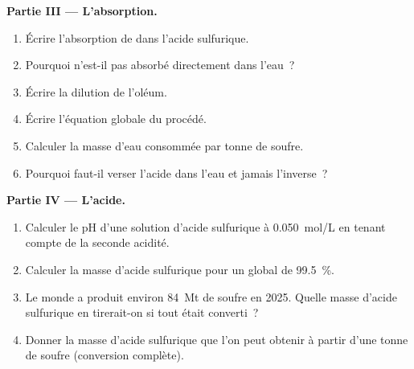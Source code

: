 \begin{problem}
\medskip
\noindent\textbf{Partie III --- L'absorption.}
\begin{enumerate}[resume]
  \item Écrire l'absorption de  dans l'acide sulfurique.
  \item Pourquoi  n'est-il pas absorbé directement dans l'eau~?
  \item Écrire la dilution de l'oléum.
  \item Écrire l'équation globale du procédé.
  \item Calculer la masse d'eau consommée par tonne de soufre.
  \item Pourquoi faut-il verser l'acide dans l'eau et jamais
        l'inverse~?
\end{enumerate}

\medskip
\noindent\textbf{Partie IV --- L'acide.}
\begin{enumerate}[resume]
  \item Calculer le pH d'une solution d'acide sulfurique à
        \qty{0.050}{mol/L} en tenant compte de la seconde acidité.
  \item Calculer la masse d'acide sulfurique pour un  global de
        \qty{99.5}{\percent}.
  \item Le monde a produit environ \qty{84}{Mt} de soufre en 2025. Quelle
        masse d'acide sulfurique en tirerait-on si tout était converti~?
  \item Donner la masse d'acide sulfurique que l'on peut obtenir à partir
        d'une tonne de soufre (conversion complète).
\end{enumerate}
\end{problem}

